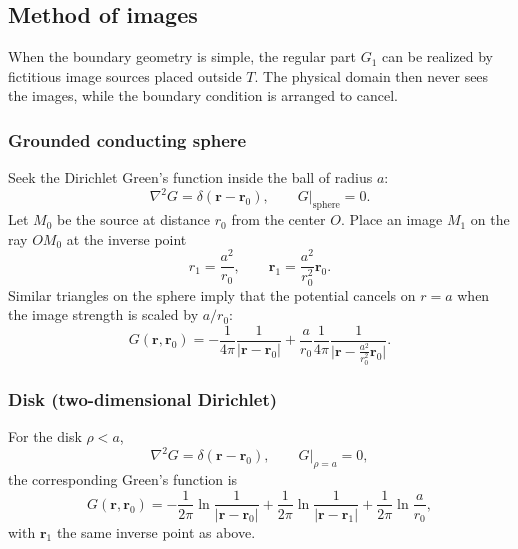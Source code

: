 \subsection{Method of images}

When the boundary geometry is simple, the regular part $G_1$ can be realized by fictitious image sources placed outside $T$. The physical domain then never sees the images, while the boundary condition is arranged to cancel.

\subsubsection{Grounded conducting sphere}

Seek the Dirichlet Green's function inside the ball of radius $a$:
\begin{equation}
\nabla^2 G=\delta(\mathbf{r}-\mathbf{r}_0),\qquad G\big|_{\text{sphere}}=0.
\end{equation}
Let $M_0$ be the source at distance $r_0$ from the center $O$. Place an image $M_1$ on the ray $OM_0$ at the inverse point
\begin{equation}
r_1=\frac{a^2}{r_0},
\qquad
\mathbf{r}_1=\frac{a^2}{r_0^2}\mathbf{r}_0.
\end{equation}
Similar triangles on the sphere imply that the potential cancels on $r=a$ when the image strength is scaled by $a/r_0$:
\begin{equation}
\label{eq:G-sphere}
G(\mathbf{r},\mathbf{r}_0)
=-\frac{1}{4\pi}\frac{1}{|\mathbf{r}-\mathbf{r}_0|}
+\frac{a}{r_0}\frac{1}{4\pi}\frac{1}{\bigl|\mathbf{r}-\tfrac{a^2}{r_0^2}\mathbf{r}_0\bigr|}.
\end{equation}

\subsubsection{Disk (two-dimensional Dirichlet)}

For the disk $\rho<a$,
\begin{equation}
\nabla^2 G=\delta(\mathbf{r}-\mathbf{r}_0),\qquad G\big|_{\rho=a}=0,
\end{equation}
the corresponding Green's function is
\begin{equation}
\label{eq:G-disk}
G(\mathbf{r},\mathbf{r}_0)
=-\frac{1}{2\pi}\ln\frac{1}{|\mathbf{r}-\mathbf{r}_0|}
+\frac{1}{2\pi}\ln\frac{1}{|\mathbf{r}-\mathbf{r}_1|}
+\frac{1}{2\pi}\ln\frac{a}{r_0},
\end{equation}
with $\mathbf{r}_1$ the same inverse point as above.

